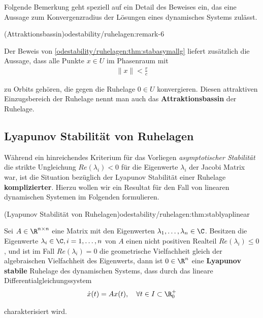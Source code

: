 \documentclass[letterpaper,10pt,german]{jupyterBook}
\begin{document}
\par
Folgende Bemerkung geht speziell auf ein Detail des Beweises ein, das eine Aussage zum Konvergenzradius der Lösungen eines dynamisches Systems zulässt.
\begin{remark}{(Attraktionsbassin)}{odestability/ruhelagen:remark-6}



\par
Der Beweis von \cref{odestability/ruhelagen:thm:stabasymallg} liefert zusätzlich die Aussage, dass alle Punkte \(x\in U\) im Phasenraum mit
\begin{align*}
\|x\| < \frac{r}{c}
\end{align*}
\par
zu Orbits gehören, die gegen die Ruhelage \(0 \in U\) konvergieren.
Diesen attraktiven Einzugsbereich der Ruhelage nennt man auch das \textbf{Attraktionsbassin} der Ruhelage.
\end{remark}


\subsection{Lyapunov Stabilität von Ruhelagen}
\label{\detokenize{odestability/ruhelagen:lyapunov-stabilitat-von-ruhelagen}}
\par
Während ein hinreichendes Kriterium für das Vorliegen \emph{asymptotischer Stabilität} die strikte Ungleichung \(Re(\lambda_i)<0\) für die Eigenwerte \(\lambda_i\) der Jacobi Matrix war, ist die Situation bezüglich der Lyapunov Stabilität einer Ruhelage \textbf{komplizierter}.
Hierzu wollen wir ein Resultat für den Fall von linearen dynamischen Systemen im Folgenden formulieren.
\begin{theorem}{(Lyapunov Stabilität von Ruhelagen)}{odestability/ruhelagen:thm:stablyaplinear}



\par
Sei \(A\in \R^{n\times n}\) eine Matrix mit den Eigenwerten \(\lambda_1,\dots, \lambda_n\in \C\).
Besitzen die Eigenwerte \(\lambda_i \in \C, i=1,\ldots,n\) von \(A\) einen nicht positiven Realteil \(Re(\lambda_i) \leq 0\), und ist im Fall \(Re(\lambda_i)=0\) die geometrische Vielfachheit gleich der algebraischen Vielfachheit des Eigenwerts, dann ist \(0\in \R^n\) eine \textbf{Lyapunov stabile} Ruhelage des dynamischen Systems, dass durch das lineare Differentialgleichungssystem
\begin{align*}
\dot{x}(t) = Ax(t), \quad  \forall t \in I \subset \R^+_0
\end{align*}
\par
charakterisiert wird.
\end{theorem}
\end{document}
